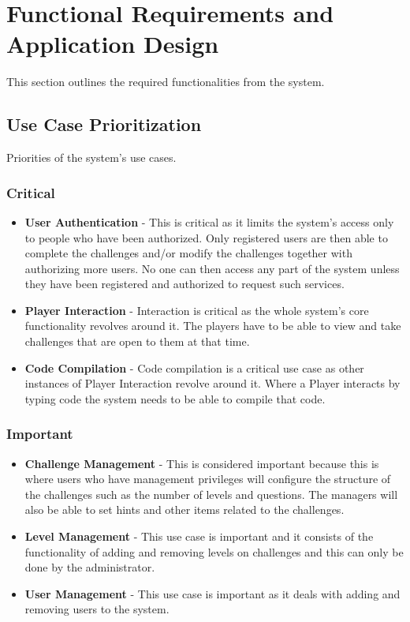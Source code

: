 \documentclass[english]{article}
\begin{document}
	\newpage
	\section{Functional Requirements and Application Design}
	This section outlines the required functionalities from the system.
		\subsection{Use Case Prioritization}
		Priorities of the system's use cases.
		\subsubsection{Critical}
		\begin{itemize}
	  		\item \textbf{User Authentication} - This is critical as it limits the system's access only to people who have been authorized. Only registered users are then able to 		complete the challenges and/or modify the challenges together with authorizing more users. No one can then access any part of the system unless they have been registered and authorized to request such services.
	  		
			\item \textbf{Player Interaction} -  Interaction is critical as the whole system's core functionality revolves around it. The players have to be able to view and take challenges that are open to them at that time.
			
			\item \textbf{Code Compilation} - Code compilation is a critical use case as other instances of Player Interaction revolve around it. Where a Player interacts by typing code the system needs to be able to compile that code.
	   \end{itemize} 
		
		\subsubsection{Important}
		\begin{itemize}
	  		\item \textbf{Challenge Management} - This is considered important because this is where users who have management privileges will configure the structure of the challenges such as the number of levels and questions. The managers will also be able to set hints and other items related to the challenges.
	  		\item \textbf{Level Management} - This use case is important and it consists of the functionality of adding and removing 
	  		levels on challenges and this can only be done by the administrator. 
	  		\item \textbf{User Management} - This use case is important as it deals with adding and removing users to the system. 
	   \end{itemize} 
			
\end{document}
